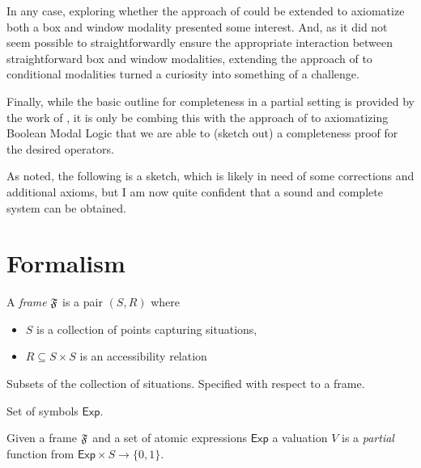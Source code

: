 \documentclass[10pt]{article}
\begin{document}
In any case, exploring whether the approach of \citeauthor{Jaspars:1996aa} could be extended to axiomatize both a box and window modality presented some interest.
And, as it did not seem possible to straightforwardly ensure the appropriate interaction between straightforward box and window modalities, extending the approach of \citeauthor{Jaspars:1996aa} to conditional modalities turned a curiosity into something of a challenge.

Finally, while the basic outline for completeness in a partial setting is provided by the work of \citeauthor{Jaspars:1996aa}, it is only be combing this with the approach of \textcite{Gargov:1987aa} to axiomatizing Boolean Modal Logic that we are able to (sketch out) a completeness proof for the desired operators.

As noted, the following is a sketch, which is likely in need of some corrections and additional axioms, but I am now quite confident that a sound and complete system can be obtained.

\section{Formalism}
\label{sec:formalism}

\begin{definition}[Frame]
  A \emph{frame} \(\mathfrak{F}\) is a pair \((S, R)\) where
  \begin{itemize}
  \item \(S\) is a collection of points capturing situations,
  \item \(R \subseteq S \times S\) is an accessibility relation
  \end{itemize}
\end{definition}

\begin{definition}[Propositions]
  Subsets of the collection of situations.
  Specified with respect to a frame.
\end{definition}

\begin{definition}
  Set of symbols \(\mathsf{Exp}\).
\end{definition}

\begin{definition}[Valuation]
  Given a frame \(\mathfrak{F}\) and a set of atomic expressions \(\mathsf{Exp}\) a valuation \(V\) is a \emph{partial} function from \(\mathsf{Exp} \times S \to \{0, 1\}\).
\end{definition}
\end{document}
